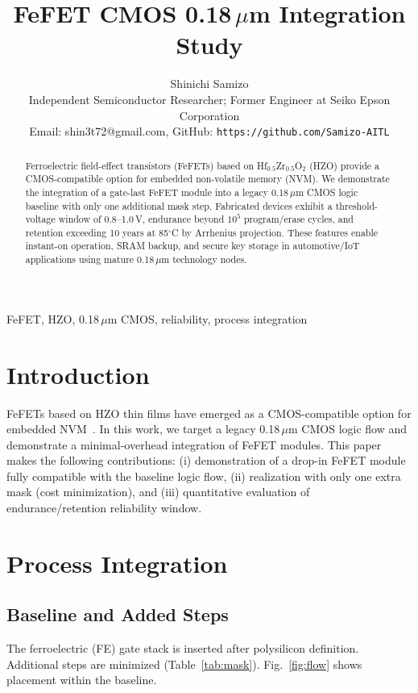 \documentclass[conference]{IEEEtran}
\title{FeFET CMOS 0.18\,$\mu$m Integration Study}
\author{
  Shinichi Samizo\\
  \small Independent Semiconductor Researcher; Former Engineer at Seiko Epson Corporation\\
  \small Email: shin3t72@gmail.com, GitHub: \texttt{https://github.com/Samizo-AITL}
}
\begin{document}
\maketitle

\begin{abstract}
Ferroelectric field-effect transistors (FeFETs) based on Hf$_{0.5}$Zr$_{0.5}$O$_2$ (HZO) provide a CMOS-compatible option for embedded non-volatile memory (NVM). We demonstrate the integration of a gate-last FeFET module into a legacy 0.18\,$\mu$m CMOS logic baseline with only one additional mask step. Fabricated devices exhibit a threshold-voltage window of 0.8--1.0\,V, endurance beyond $10^5$ program/erase cycles, and retention exceeding 10 years at 85$^\circ$C by Arrhenius projection. These features enable instant-on operation, SRAM backup, and secure key storage in automotive/IoT applications using mature 0.18\,$\mu$m technology nodes.
\end{abstract}

\begin{IEEEkeywords}
FeFET, HZO, 0.18\,$\mu$m CMOS, reliability, process integration
\end{IEEEkeywords}

\section{Introduction}
FeFETs based on HZO thin films have emerged as a CMOS-compatible option for embedded NVM~\cite{boescke2011, mueller2012, schenk2019}. In this work, we target a legacy 0.18\,$\mu$m CMOS logic flow and demonstrate a minimal-overhead integration of FeFET modules. This paper makes the following contributions:  
(i) demonstration of a drop-in FeFET module fully compatible with the baseline logic flow,  
(ii) realization with only one extra mask (cost minimization), and  
(iii) quantitative evaluation of endurance/retention reliability window.  

\section{Process Integration}
\subsection{Baseline and Added Steps}
The ferroelectric (FE) gate stack is inserted after polysilicon definition. Additional steps are minimized (Table~\ref{tab:mask}). Fig.~\ref{fig:flow} shows placement within the baseline.
\end{document}
